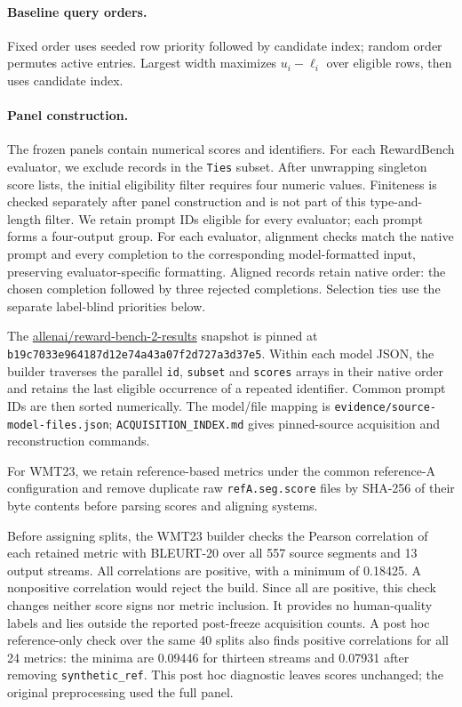 \paragraph{Baseline query orders.} Fixed order uses seeded row priority followed by candidate index; random order permutes active entries. Largest width maximizes $u_i-\ell_i$ over eligible rows, then uses candidate index.

\paragraph{Panel construction.}
The frozen panels contain numerical scores and identifiers. For each RewardBench evaluator, we exclude records in the \texttt{Ties} subset. After unwrapping singleton score lists, the initial eligibility filter requires four numeric values. Finiteness is checked separately after panel construction and is not part of this type-and-length filter. We retain prompt IDs eligible for every evaluator; each prompt forms a four-output group. For each evaluator, alignment checks match the native prompt and every completion to the corresponding model-formatted input, preserving evaluator-specific formatting. Aligned records retain native order: the chosen completion followed by three rejected completions. Selection ties use the separate label-blind priorities below. 

The \href{https://huggingface.co/datasets/allenai/reward-bench-2-results}{allenai/reward-bench-2-results} snapshot is pinned at \texttt{b19c7033e964187d12e74}\allowbreak\texttt{a43a07f2d727a3d37e5}. Within each model JSON, the builder traverses the parallel \texttt{id}, \texttt{subset} and \texttt{scores} arrays in their native order and retains the last eligible occurrence of a repeated identifier. Common prompt IDs are then sorted numerically. The model/file mapping is \nolinkurl{evidence/source-model-files.json}; \nolinkurl{ACQUISITION_INDEX.md} gives pinned-source acquisition and reconstruction commands. 

For WMT23, we retain reference-based metrics under the common reference-A configuration and remove duplicate raw \texttt{refA.seg.score} files by SHA-256 of their byte contents before parsing scores and aligning systems.

Before assigning splits, the WMT23 builder checks the Pearson correlation of each retained metric with BLEURT-20 \citep{sellam-etal-2020-bleurt,pu-etal-2021-learning} over all 557 source segments and 13 output streams. All correlations are positive, with a minimum of 0.18425. A nonpositive correlation would reject the build. Since all are positive, this check changes neither score signs nor metric inclusion. It provides no human-quality labels and lies outside the reported post-freeze acquisition counts. A post hoc reference-only check over the same 40 splits also finds positive correlations for all 24 metrics: the minima are 0.09446 for thirteen streams and 0.07931 after removing \texttt{synthetic\_ref}. This post hoc diagnostic leaves scores unchanged; the original preprocessing used the full panel.

